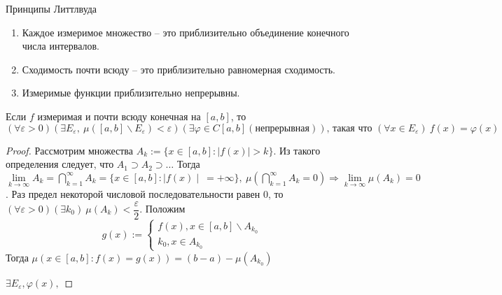 Принципы Литтлвуда
\begin{enumerate}
    \item Каждое измеримое множество -- это приблизительно объединение конечного числа интервалов.
    \item Сходимость почти всюду -- это приблизительно равномерная сходимость.
    \item Измеримые функции приблизительно непрерывны.
\end{enumerate}
\begin{theorem}[Н. Н. Лузин]
	Если $f$ измеримая и почти всюду конечная на $[a, b]$, то ${(\forall \varepsilon >0)(\exists E_{\varepsilon},\  \mu([a, b] \backslash E_{\varepsilon})<\varepsilon) (\exists \varphi \in C[a,b](\text{непрерывная}))\text{, такая что }(\forall x \in E_{\varepsilon}) \ f(x)=\varphi(x)}$
\end{theorem}
\begin{proof}
Рассмотрим множества $A_k:=\{x\in [a,b]: \mid f(x)\mid>k \}$. Из такого определения следует, что $A_1 \supset A_2 \supset \ldots$ Тогда $\lim\limits_{k\to\infty} A_k = \bigcap\limits_{k=1}^{\infty}A_k={\{x\in [a,b]: \mid f(x) \mid\ =+\infty\},}\ \mu(\bigcap\limits_{k=1}^{\infty}A_k=0) \Rightarrow \lim\limits_{k\to\infty}\mu (A_k)=0$. Раз предел некоторой числовой последовательности равен 0, то $(\forall \varepsilon >0)(\exists k_0)\ \mu (A_k)<\dfrac{\varepsilon}{2}$. Положим 
\begin{equation*}
    g(x):=\begin{cases}
    f(x), x\in [a,b]\backslash A_{k_0}\\
    k_0, x \in A_{k_0}
    \end{cases}
\end{equation*}
Тогда $\mu (x\in [a,b]:f(x)=g(x))=(b-a)-\mu(A_{k_0})$

$\exists E_{\varepsilon}, \varphi(x), $
\end{proof}